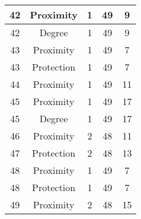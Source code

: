 \documentclass[results.tex]{subfiles}
\begin{document}
\begin{center}
\begin{tabular}{| c || c | c | c | c |}
            \hline
            42                      & Proximity                    & 1                      & 49                      & 9                    \\
            \hline
            42                      & Degree                       & 1                      & 49                      & 9                    \\
            \hline
            43                      & Proximity                    & 1                      & 49                      & 7                    \\
            \hline
            43                      & Protection                   & 1                      & 49                      & 7                    \\
            \hline
            44                      & Proximity                    & 1                      & 49                      & 11                   \\
            \hline
            45                      & Proximity                    & 1                      & 49                      & 17                   \\
            \hline
            45                      & Degree                       & 1                      & 49                      & 17                   \\
            \hline
            46                      & Proximity                    & 2                      & 48                      & 11                   \\
            \hline
            47                      & Protection                   & 2                      & 48                      & 13                   \\
            \hline
            48                      & Proximity                    & 1                      & 49                      & 7                    \\
            \hline
            48                      & Protection                   & 1                      & 49                      & 7                    \\
            \hline
            49                      & Proximity                    & 2                      & 48                      & 15                   \\
            \hline
        \end{tabular}
    \end{center}
\end{document}
